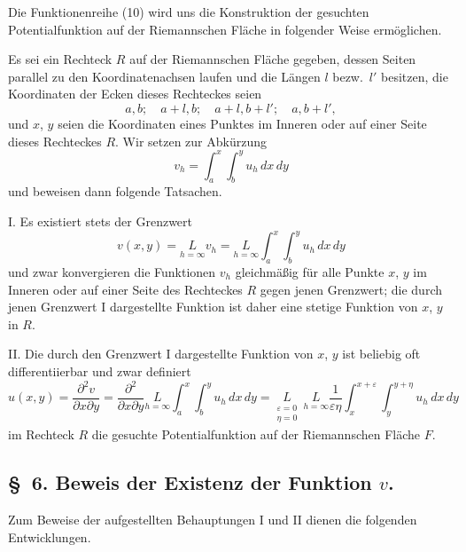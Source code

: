 \documentclass{article}
\begin{document}
Die Funktionenreihe (10) wird uns die Konstruktion der gesuchten Potentialfunktion auf der Riemannschen Fläche in folgender Weise ermöglichen.

Es sei ein Rechteck $R$ auf der Riemannschen Fläche gegeben, dessen Seiten parallel zu den Koordinatenachsen laufen und die Längen $l$ bezw.\ $l'$ besitzen, die Koordinaten der Ecken dieses Rechteckes seien
\[
a, b; \quad a+l, b; \quad a+l, b+l'; \quad a, b+l',
\]
und $x$, $y$ seien die Koordinaten eines Punktes im Inneren oder auf einer Seite dieses Rechteckes $R$. Wir setzen zur Abkürzung
\[
v_h = \int_a^x \int_b^y u_h\,dx\,dy
\]
und beweisen dann folgende Tatsachen.

I. Es existiert stets der Grenzwert
\[
v(x, y) = \underset{h=\infty}{L} v_h = \underset{h=\infty}{L} \int_a^x \int_b^y u_h\,dx\,dy \tag{I}
\]
und zwar konvergieren die Funktionen $v_h$ gleichmäßig für alle Punkte $x$, $y$ im Inneren oder auf einer Seite des Rechteckes $R$ gegen jenen Grenzwert; die durch jenen Grenzwert I dargestellte Funktion ist daher eine stetige Funktion von $x$, $y$ in $R$.

II. Die durch den Grenzwert I dargestellte Funktion von $x$, $y$ ist beliebig oft differentiierbar und zwar definiert
\[
u(x, y) = \frac{\partial^2 v}{\partial x \partial y} = \frac{\partial^2}{\partial x \partial y} \underset{h=\infty}{L} \int_a^x \int_b^y u_h\,dx\,dy = \underset{\substack{\varepsilon=0 \\ \eta=0}}{L} \ \underset{h=\infty}{L} \frac{1}{\varepsilon\eta} \int_x^{x+\varepsilon} \int_y^{y+\eta} u_h\,dx\,dy \tag{II}
\]
im Rechteck $R$ die gesuchte Potentialfunktion auf der Riemannschen Fläche $F$.


\subsection*{§~6. Beweis der Existenz der Funktion $v$.}

Zum Beweise der aufgestellten Behauptungen I und II dienen die folgenden Entwicklungen.
\end{document}
